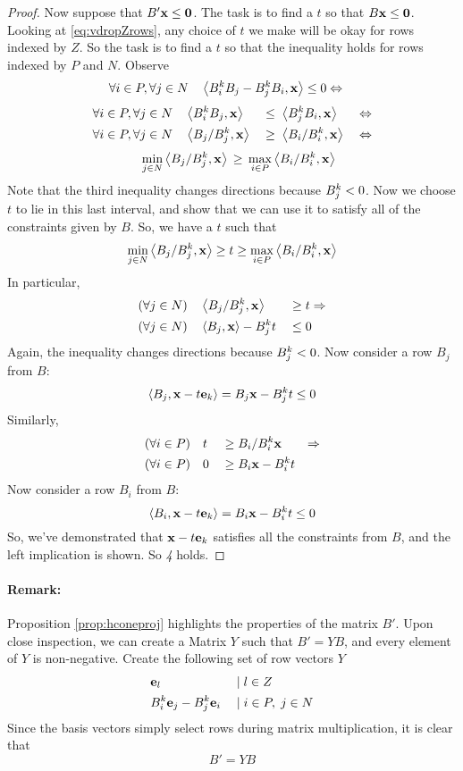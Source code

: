 \begin{proof}
  Now suppose that $B'\mathbf{x} \leq \mathbf{0}$.  The task is to find a $t$ so that $B\mathbf{x} \leq \mathbf{0}$.  Looking at \eqref{eq:vdropZrows}, any choice of $t$ we make will be okay for rows indexed by $Z$.  So the task is to find a $t$ so that the inequality holds for rows indexed by $P$ and $N$.  Observe
\begin{align*}
  \forall i\in P,\forall j \in N&\quad \left\langle B^k_i B_j - B^k_j B_i, \mathbf{x} \right\rangle \leq 0 \Leftrightarrow
\end{align*}
\vspace{-2.5em}
\begin{alignat*}{4}
  \forall i\in P,\forall j \in N&\quad \left\langle B^k_i B_j, \mathbf{x} \right\rangle &&\leq\; \left\langle B^k_j B_i, \mathbf{x} \right\rangle &\Leftrightarrow \\
  \forall i\in P,\forall j \in N&\quad \left\langle B_j/B^k_j, \mathbf{x} \right\rangle &&\geq\; \left\langle B_i/B^k_i, \mathbf{x} \right\rangle &\;\Leftrightarrow 
\end{alignat*}
\vspace{-2em}
\begin{align*}
   \quad\min_{j\in N}  \left\langle B_j/B^k_j, \mathbf{x} \right\rangle \,\geq\, \max_{i\in P} \left\langle B_i/B^k_i, \mathbf{x} \right\rangle
\end{align*}
Note that the third inequality changes directions because $B^k_j < 0$.  Now we choose $t$ to lie in this last interval, and show that we can use it to satisfy all of the constraints given by $ B$.  So, we have a $t$ such that
\[ \min_{j\in N}  \left\langle B_j/B^k_j, \mathbf{x} \right\rangle \geq t 
          \geq \max_{i\in P} \left\langle B_i/B^k_i, \mathbf{x} \right\rangle \]
In particular,
\begin{alignat*}{2}
 (\forall j\in N)\quad & \left\langle B_j/B^k_j, \mathbf{x} \right\rangle     \;&\geq&\; t \Rightarrow \\
 (\forall j\in N)\quad & \left\langle B_j, \mathbf{x} \right\rangle - B^k_j t \;&\leq&\; 0
\end{alignat*}
Again, the inequality changes directions because $B^k_j < 0$.  Now consider a row $ B_j$ from $ B$:
\[ \left\langle B_j, \mathbf{x}-t\mathbf{e}_k \right\rangle =  B_j {\mathbf{x}} - B^k_j t \leq 0 \]
Similarly,
\begin{alignat*}{3}
 (\forall i\in P)\quad & t \;&\geq&\;  B_i/B^k_i {\mathbf{x}} &\Rightarrow \\
 (\forall i\in P)\quad & 0 \;&\geq&\;  B_i {\mathbf{x}} - B^k_i t &
\end{alignat*}
Now consider a row $ B_i$ from $ B$:
\[ \left\langle B_i, \mathbf{x}-t\mathbf{e}_k \right\rangle =  B_i {\mathbf{x}} - B^k_i t \leq 0 \]
So, we've demonstrated that $\mathbf{x}-t\mathbf{e}_k$ satisfies all the constraints from $B$, and the left implication is shown.  So \textit{4} holds.
\end{proof}

\paragraph{Remark:}  \label{rem:fm} Proposition \ref{prop:hconeproj} highlights the properties of the matrix $B'$.  Upon close inspection, we can create a Matrix $Y$ such that $B' = YB$, and every element of $Y$ is non-negative.  Create the following set of row vectors $Y$
\begin{alignat*}{2}
  &\mathbf{e}_l                  &\;|\;& l \in Z \\
  &B^k_i \mathbf{e}_j - B^k_j \mathbf{e}_i &\;|\;& i\in P,\; j\in N
\end{alignat*}
Since the basis vectors simply select rows during matrix multiplication, it is clear that
 \[ B' = YB \]

